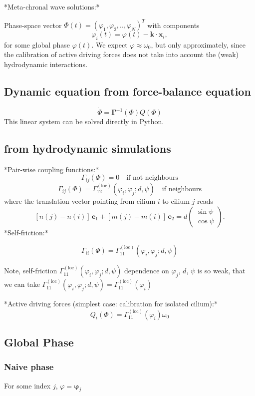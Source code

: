 \documentclass[a4paper,12pt]{article}
\begin{document}
*Meta-chronal wave solutions:*

Phase-space vector
$ \Phi (t) = (\varphi_1, \varphi_2, .., \varphi_{N})^T $
with components
$$
\varphi_i(t) = \varphi(t) - \mathbf{k} \cdot \mathbf{x}_i,
$$
for some global phase $\varphi(t)$.
We expect $\dot{\varphi}\approx\omega_0$, but only approximately, since the calibration of active driving forces does not take into account the (weak) hydrodynamic interactions.

\subsection*{Dynamic equation from force-balance equation}

$$ \dot{\Phi} = \mathbf{\Gamma}^{-1}(\Phi)Q(\Phi)  $$
This linear system can be solved directly in Python.


\subsection*{from hydrodynamic simulations}

*Pair-wise coupling functions:*
$$ \Gamma_{ij}(\Phi) = 0 \quad \text{if not neighbours} $$
$$ \Gamma_{ij}(\Phi) = \Gamma_{12}^{\mathrm{(loc)}}(\varphi_i,\varphi_j; d, \psi) \quad \text{if neighbours} $$
where the translation vector pointing from cilium $i$ to cilium $j$ reads
$$[n(j)-n(i)]\,\mathbf{e}_1 + [m(j)-m(i)]\,\mathbf{e}_2 = d \left( \begin{array}{c} \sin\psi \\ \cos\psi \end{array} \right).$$
*Self-friction:*

$$ \Gamma_{ii}(\Phi) = \Gamma_{11}^{\mathrm{(loc)}}(\varphi_i, \varphi_j; d, \psi) $$

Note, self-friction $\Gamma_{11}^{\mathrm{(loc)}}(\varphi_i, \varphi_j; d, \psi) $ dependence on $\varphi_j$, $d$, $\psi$ is so weak, that we can take
$\Gamma_{11}^{\mathrm{(loc)}}(\varphi_i, \varphi_j; d, \psi)= \Gamma_{11}^{\mathrm{(loc)}}(\varphi_i)$



*Active driving forces (simplest case: calibration for isolated cilium):*
$$ Q_{i}(\Phi) = \Gamma_{11}^{\mathrm{(loc)}}(\varphi_i) \omega_0 $$


\subsection*{Global Phase}

\subsubsection*{Naive phase}
For some index $j$, $\varphi = \mathbf{\varphi}_j$
\end{document}
